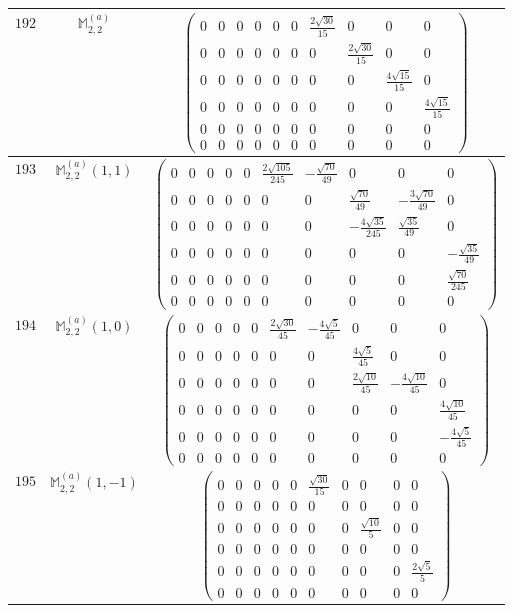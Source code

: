 \documentclass[fleqn,8pt,landscape]{jsarticle}
\begin{document}
\begin{center}
\begin{longtable}{ccc}
$ 192 $ & $ \mathbb{M}_{2,2}^{(a)} $ & $ \begin{pmatrix} 0 & 0 & 0 & 0 & 0 & 0 & \frac{2 \sqrt{30}}{15} & 0 & 0 & 0 \\ 0 & 0 & 0 & 0 & 0 & 0 & 0 & \frac{2 \sqrt{30}}{15} & 0 & 0 \\ 0 & 0 & 0 & 0 & 0 & 0 & 0 & 0 & \frac{4 \sqrt{15}}{15} & 0 \\ 0 & 0 & 0 & 0 & 0 & 0 & 0 & 0 & 0 & \frac{4 \sqrt{15}}{15} \\ 0 & 0 & 0 & 0 & 0 & 0 & 0 & 0 & 0 & 0 \\ 0 & 0 & 0 & 0 & 0 & 0 & 0 & 0 & 0 & 0 \end{pmatrix} $ \\ \hline
$ 193 $ & $ \mathbb{M}_{2,2}^{(a)}(1,1) $ & $ \begin{pmatrix} 0 & 0 & 0 & 0 & 0 & \frac{2 \sqrt{105}}{245} & - \frac{\sqrt{70}}{49} & 0 & 0 & 0 \\ 0 & 0 & 0 & 0 & 0 & 0 & 0 & \frac{\sqrt{70}}{49} & - \frac{3 \sqrt{70}}{49} & 0 \\ 0 & 0 & 0 & 0 & 0 & 0 & 0 & - \frac{4 \sqrt{35}}{245} & \frac{\sqrt{35}}{49} & 0 \\ 0 & 0 & 0 & 0 & 0 & 0 & 0 & 0 & 0 & - \frac{\sqrt{35}}{49} \\ 0 & 0 & 0 & 0 & 0 & 0 & 0 & 0 & 0 & \frac{\sqrt{70}}{245} \\ 0 & 0 & 0 & 0 & 0 & 0 & 0 & 0 & 0 & 0 \end{pmatrix} $ \\ \hline
$ 194 $ & $ \mathbb{M}_{2,2}^{(a)}(1,0) $ & $ \begin{pmatrix} 0 & 0 & 0 & 0 & 0 & \frac{2 \sqrt{30}}{45} & - \frac{4 \sqrt{5}}{45} & 0 & 0 & 0 \\ 0 & 0 & 0 & 0 & 0 & 0 & 0 & \frac{4 \sqrt{5}}{45} & 0 & 0 \\ 0 & 0 & 0 & 0 & 0 & 0 & 0 & \frac{2 \sqrt{10}}{45} & - \frac{4 \sqrt{10}}{45} & 0 \\ 0 & 0 & 0 & 0 & 0 & 0 & 0 & 0 & 0 & \frac{4 \sqrt{10}}{45} \\ 0 & 0 & 0 & 0 & 0 & 0 & 0 & 0 & 0 & - \frac{4 \sqrt{5}}{45} \\ 0 & 0 & 0 & 0 & 0 & 0 & 0 & 0 & 0 & 0 \end{pmatrix} $ \\ \hline
$ 195 $ & $ \mathbb{M}_{2,2}^{(a)}(1,-1) $ & $ \begin{pmatrix} 0 & 0 & 0 & 0 & 0 & \frac{\sqrt{30}}{15} & 0 & 0 & 0 & 0 \\ 0 & 0 & 0 & 0 & 0 & 0 & 0 & 0 & 0 & 0 \\ 0 & 0 & 0 & 0 & 0 & 0 & 0 & \frac{\sqrt{10}}{5} & 0 & 0 \\ 0 & 0 & 0 & 0 & 0 & 0 & 0 & 0 & 0 & 0 \\ 0 & 0 & 0 & 0 & 0 & 0 & 0 & 0 & 0 & \frac{2 \sqrt{5}}{5} \\ 0 & 0 & 0 & 0 & 0 & 0 & 0 & 0 & 0 & 0 \end{pmatrix} $ \\ \hline

\end{longtable}
\end{center}
\end{document}
